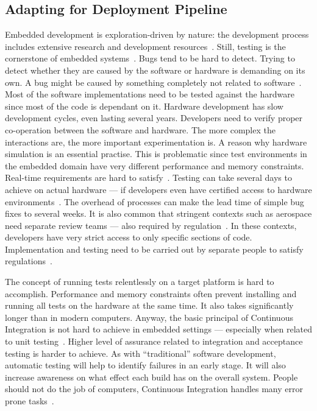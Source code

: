 \documentclass[english]{tktltiki2}
\begin{document}
\subsection{Adapting for Deployment Pipeline}

Embedded development is exploration-driven by nature: the development process includes extensive research and development resources~\cite{EHS14}. Still, testing is the cornerstone of embedded systems~\cite{RA03, HAB12, KRM13, EHS14, Ngy15}. Bugs tend to be hard to detect. Trying to detect whether they are caused by the software or hardware is demanding on its own. A bug might be caused by something completely not related to software~\cite{Ngy15}. Most of the software implementations need to be tested against the hardware since most of the code is dependant on it. Hardware development has slow development cycles, even lasting several years. Developers need to verify proper co-operation between the software and hardware. The more complex the interactions are, the more important experimentation is. A reason why hardware simulation is an essential practise. This is problematic since test environments in the embedded domain have very different performance and memory constraints. Real-time requirements are hard to satisfy~\cite{RA03, HMP12}. Testing can take several days to achieve on actual hardware — if developers even have certified access to hardware environments~\cite{VB09}. The overhead of processes can make the lead time of simple bug fixes to several weeks. It is also common that stringent contexts such as aerospace need separate review teams — also required by regulation~\cite{VB09}. In these contexts, developers have very strict access to only specific sections of code. Implementation and testing need to be carried out by separate people to satisfy regulations~\cite{VB09, JLP12}.

The concept of running tests relentlessly on a target platform is hard to accomplish. Performance and memory constraints often prevent installing and running all tests on the hardware at the same time. It also takes significantly longer than in modern computers. Anyway, the basic principal of Continuous Integration is not hard to achieve in embedded settings — especially when related to unit testing~\cite{RA03, KRM13}. Higher level of assurance related to integration and acceptance testing is harder to achieve. As with “traditional” software development, automatic testing will help to identify failures in an early stage. It will also increase awareness on what effect each build has on the overall system. People should not do the job of computers, Continuous Integration handles many error prone tasks~\cite{Ngy15}.
\end{document}
